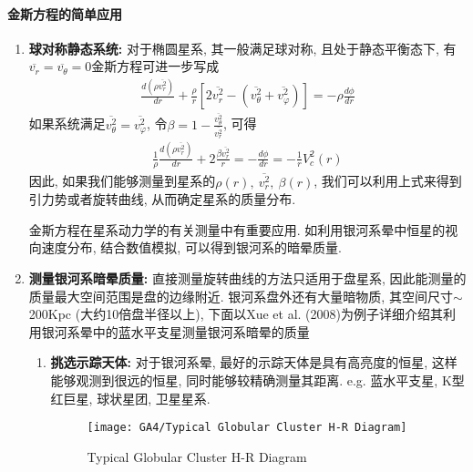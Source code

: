 \paragraph{金斯方程的简单应用}
\begin{enumerate}
    \item \textbf{球对称静态系统: }
    对于椭圆星系, 其一般满足球对称, 且处于静态平衡态下, 有$\overline{v_r}=\overline{v_\theta}=0$金斯方程可进一步写成
    \begin{align*}
        \frac{d(\rho\overline{v_r^2})}{dr}+\frac{\rho}{r}\left[ 2\overline{v_r^2}-(\overline{v_\theta^2}+\overline{v_\varphi^2}) \right]=-\rho\frac{d\phi}{dr}
    \end{align*}
    如果系统满足$\overline{v_\theta^2}=\overline{v_\varphi^2}$, 令$\beta=1-\frac{\overline{v_\theta^2}}{\overline{v_r^2}}$, 可得
    \begin{align*}
        \frac{1}{\rho}\frac{d(\rho\overline{v_r^2})}{dr}+2\frac{\beta \overline{v_r^2}}{r}=-\frac{d\phi}{dr}=-\frac{1}{r}V_c^2(r)
    \end{align*}
    因此, 如果我们能够测量到星系的$\rho(r),\ \overline{v_r^2},\ \beta(r)$, 我们可以利用上式来得到引力势或者旋转曲线, 从而确定星系的质量分布. 

    金斯方程在星系动力学的有关测量中有重要应用. 如利用银河系晕中恒星的视向速度分布, 结合数值模拟, 可以得到银河系的暗晕质量. 
    \item \textbf{测量银河系暗晕质量: }直接测量旋转曲线的方法只适用于盘星系, 因此能测量的质量最大空间范围是盘的边缘附近. 银河系盘外还有大量暗物质, 其空间尺寸$\sim$200Kpc (大约10倍盘半径以上), 下面以Xue et al. (2008)为例子详细介绍其利用银河系晕中的蓝水平支星测量银河系暗晕的质量
    \begin{enumerate}\small
        \item \textbf{挑选示踪天体: }对于银河系晕, 最好的示踪天体是具有高亮度的恒星, 这样能够观测到很远的恒星, 同时能够较精确测量其距离. e.g. 蓝水平支星, K型红巨星, 球状星团, 卫星星系. 
        \begin{figure}[!htb]
            \centering
            \texttt{[image: GA4/Typical Globular Cluster H-R Diagram]}
            \caption{Typical Globular Cluster H-R Diagram}
        \end{figure}
        

\end{enumerate}
\end{enumerate}
